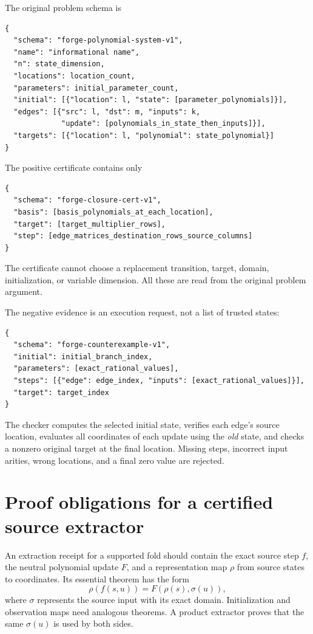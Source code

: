 \documentclass[11pt,letterpaper]{article}
\theoremstyle{definition}
\begin{document}
The original problem schema is
\begin{lstlisting}
{
  "schema": "forge-polynomial-system-v1",
  "name": "informational name",
  "n": state_dimension,
  "locations": location_count,
  "parameters": initial_parameter_count,
  "initial": [{"location": l, "state": [parameter_polynomials]}],
  "edges": [{"src": l, "dst": m, "inputs": k,
             "update": [polynomials_in_state_then_inputs]}],
  "targets": [{"location": l, "polynomial": state_polynomial}]
}
\end{lstlisting}
The positive certificate contains only
\begin{lstlisting}
{
  "schema": "forge-closure-cert-v1",
  "basis": [basis_polynomials_at_each_location],
  "target": [target_multiplier_rows],
  "step": [edge_matrices_destination_rows_source_columns]
}
\end{lstlisting}
The certificate cannot choose a replacement transition, target, domain,
initialization, or variable dimension. All these are read from the original
problem argument.

The negative evidence is an execution request, not a list of trusted states:
\begin{lstlisting}
{
  "schema": "forge-counterexample-v1",
  "initial": initial_branch_index,
  "parameters": [exact_rational_values],
  "steps": [{"edge": edge_index, "inputs": [exact_rational_values]}],
  "target": target_index
}
\end{lstlisting}
The checker computes the selected initial state, verifies each edge's source
location, evaluates all coordinates of each update using the \emph{old} state,
and checks a nonzero original target at the final location. Missing steps,
incorrect input arities, wrong locations, and a final zero value are rejected.

\section{Proof obligations for a certified source extractor}

An extraction receipt for a supported fold should contain the exact source
step $f$, the neutral polynomial update $F$, and a representation map $\rho$
from source states to coordinates. Its essential theorem has the form
\[
 \rho(f(s,u))=F(\rho(s),\sigma(u)),
\]
where $\sigma$ represents the source input with its exact domain. Initialization
and observation maps need analogous theorems. A product extractor proves that
the same $\sigma(u)$ is used by both sides.
\end{document}
